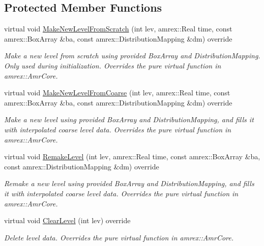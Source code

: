 \subsection*{Protected Member Functions}
\begin{DoxyCompactItemize}
\item 
virtual void \mbox{\hyperlink{classsledgehamr_1_1Sledgehamr_a29f2cfdb24f159a165d177012ca7f219}{Make\+New\+Level\+From\+Scratch}} (int lev, amrex\+::\+Real time, const amrex\+::\+Box\+Array \&ba, const amrex\+::\+Distribution\+Mapping \&dm) override
\begin{DoxyCompactList}\small\item\em Make a new level from scratch using provided Box\+Array and Distribution\+Mapping. Only used during initialization. Overrides the pure virtual function in amrex\+::\+Amr\+Core. \end{DoxyCompactList}\item 
virtual void \mbox{\hyperlink{classsledgehamr_1_1Sledgehamr_ae6cc40f77442f989b46196439ca1310e}{Make\+New\+Level\+From\+Coarse}} (int lev, amrex\+::\+Real time, const amrex\+::\+Box\+Array \&ba, const amrex\+::\+Distribution\+Mapping \&dm) override
\begin{DoxyCompactList}\small\item\em Make a new level using provided Box\+Array and Distribution\+Mapping, and fills it with interpolated coarse level data. Overrides the pure virtual function in amrex\+::\+Amr\+Core. \end{DoxyCompactList}\item 
virtual void \mbox{\hyperlink{classsledgehamr_1_1Sledgehamr_a66eafb81586abbd98cea7eb7e99db338}{Remake\+Level}} (int lev, amrex\+::\+Real time, const amrex\+::\+Box\+Array \&ba, const amrex\+::\+Distribution\+Mapping \&dm) override
\begin{DoxyCompactList}\small\item\em Remake a new level using provided Box\+Array and Distribution\+Mapping, and fills it with interpolated coarse level data. Overrides the pure virtual function in amrex\+::\+Amr\+Core. \end{DoxyCompactList}\item 
virtual void \mbox{\hyperlink{classsledgehamr_1_1Sledgehamr_a767607bce4ba621f509c6279faa7195f}{Clear\+Level}} (int lev) override
\begin{DoxyCompactList}\small\item\em Delete level data. Overrides the pure virtual function in amrex\+::\+Amr\+Core. \end{DoxyCompactList}\item 

\end{DoxyCompactItemize}
